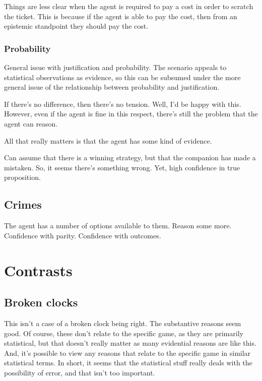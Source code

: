 \documentclass[10pt]{article}
\begin{document}
Things are less clear when the agent is required to pay a cost in order to scratch the ticket.
This is because if the agent is able to pay the cost, then from an epistemic standpoint they should pay the cost.



\subsubsection{Probability}
\label{sec:probability}

General issue with justification and probability.
The scenario appeals to statistical observations as evidence, so this can be subsumed under the more general issue of the relationship between probability and justification.

If there's no difference, then there's no tension.
Well, I'd be happy with this.
However, even if the agent is fine in this respect, there's still the problem that the agent can reason.



All that really matters is that the agent has some kind of evidence.




Can assume that there is a winning strategy, but that the companion has made a mistaken.
So, it seems there's something wrong.
Yet, high confidence in true proposition.

\subsection{Crimes}
\label{sec:crimes}

The agent has a number of options available to them.
Reason some more.
Confidence with parity.
Confidence with outcomes.


\section{Contrasts}
\label{sec:contrasts}

\subsection{Broken clocks}
\label{sec:broken-clocks}

This isn't a case of a broken clock being right.
The substantive reasons seem good.
Of course, these don't relate to the specific game, as they are primarily statistical, but that doesn't really matter as many evidential reasons are like this.
And, it's possible to view any reasons that relate to the specific game in similar statistical terms.
In short, it seems that the statistical stuff really deals with the possibility of error, and that isn't too important.
\end{document}
